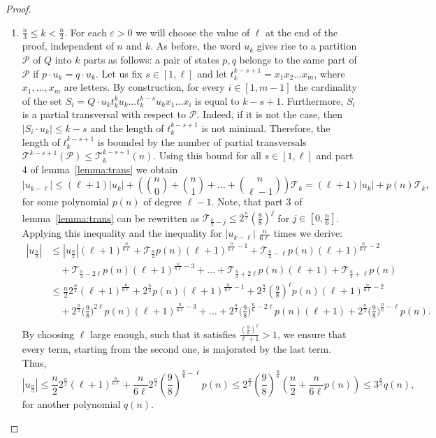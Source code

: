 \documentclass[a4paper,USenglish]{lipics}
\theoremstyle{definition}
\begin{document}
\begin{proof}
\begin{enumerate}
\item $\frac{n}{3} \leq k < \frac{n}{2}$. For each $\varepsilon>0$ we will choose the value of $\ell$ at the end of the proof, independent of $n$ and $k$. As before, the word $u_k$ gives rise to a partition $\mathscr{P}$ of $Q$ into $k$ parts as follows: a pair of states $p,q$ belongs to the same part of $\mathscr{P}$ if $p\cdot u_k = q \cdot u_k$. 
Let us fix $s \in [1,\ell]$ and let $t_k^{k-s+1} = x_1x_2\ldots x_m$, where $x_1,\ldots,x_m$ are letters. By construction, for every $i \in [1,m-1]$ the cardinality of the set $S_i = Q \cdot u_k t_k^k u_k \ldots t_k^{k-s} u_k x_1 \ldots x_i$ is equal to $k-s+1$. Furthermore, $S_i$ is a partial transversal with respect to $\mathscr{P}$. 
Indeed, if it is not the case, then $|S_{i}\cdot u_k| \leq k-s$ and the length of $t_k^{k-s+1}$ is not minimal. 
Therefore, the length of $t_k^{k-s+1}$ is bounded by the number of partial transversals $\mathscr{T}^{k-s+1}(\mathscr{P}) \leq \mathscr{T}_k^{k-s+1}(n)$. 
Using this bound for all $s \in [1,\ell]$ and part 4 of lemma~\ref{lemma:trans} we obtain
$$|u_{k-\ell}| \leq (\ell+1) |u_k| + \left({n\choose 0} + {n \choose 1} + \ldots + {n \choose \ell-1} \right)\mathscr{T}_k = (\ell+1) |u_k| +  p(n) \mathscr{T}_k,$$
for some polynomial $p(n)$ of degree $\ell-1$.
Note, that part 3 of lemma~\ref{lemma:trans} can be rewritten as $\mathscr{T}_{\frac{n}{2} - j} \leq 2^{\frac{n}{2}}\left( \tfrac{9}{8} \right)^j$ for $j \in [0,\tfrac{n}{6}]$. Applying this inequality and the inequality for $|u_{k-\ell}|$ $\frac{n}{6 \ell}$ times we derive:
\begin{align*}
|u_\frac{n}{3}| &\leq |u_\frac{n}{2}| (\ell + 1)^\frac{n}{6\ell} + \mathscr{T}_\frac{n}{2} p(n) (\ell+1)^{\frac{n}{6\ell}-1} + \mathscr{T}_{\frac{n}{2} - \ell} p(n) (\ell+1)^{\frac{n}{6\ell}-2} \\
 &\quad + \mathscr{T}_{\frac{n}{2} - 2\ell} p(n) (\ell+1)^{\frac{n}{6\ell}-3} + \ldots + \mathscr{T}_{\frac{n}{3} + 2\ell} p(n)(\ell + 1) + \mathscr{T}_{\frac{n}{3} + \ell} p(n)\\
&\leq \frac{n}{2} 2^\frac{n}{2} (\ell + 1)^\frac{n}{6\ell} + 2^\frac{n}{2} p(n) (\ell+1)^{\frac{n}{6\ell}-1}+ 2^\frac{n}{2} \left(\frac{9}{8}\right)^{\ell}  p(n) (\ell+1)^{\frac{n}{6\ell}-2} \\
&\quad + 2^\frac{n}{2} \biggl(\frac{9}{8}\biggr)^{2\ell} \!\! p(n) (\ell+1)^{\frac{n}{6\ell}-3} + \ldots + 2^\frac{n}{2} \biggl(\frac{9}{8}\biggr)^{\frac{n}{6} - 2\ell} \!\!\!\!  p(n)(\ell+1) + 2^\frac{n}{2} \biggl(\frac{9}{8}\biggr)^{\frac{n}{6} - \ell} \!\! p(n).\\
\end{align*}
By choosing $\ell$ large enough, such that it satisfies $\frac{(\frac{9}{8})^\ell}{\ell+1} > 1$, we ensure that 
every term, starting from the second one, is majorated by the last term. Thus, $$ |u_\frac{n}{3}| \leq \frac{n}{2} 2^\frac{n}{2} (\ell + 1)^\frac{n}{6\ell} + \frac{n}{6\ell} 2^\frac{n}{2} \left(\frac{9}{8}\right)^{\frac{n}{6} - \ell} p(n) \leq 2^\frac{n}{2} \left(\frac{9}{8}\right)^{\frac{n}{6}}  \left( \frac{n}{2} + \frac{n}{6\ell} p(n) \right)  \leq 3^{\frac{n}{3}} q(n),$$
for another polynomial $q(n)$.


\end{enumerate}
\end{proof}
\end{document}
